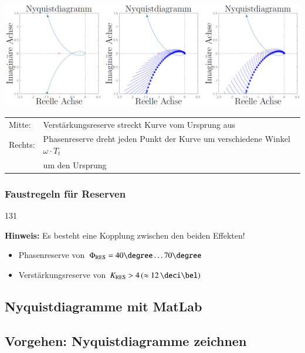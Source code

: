 
\includegraphics[width=\columnwidth]{images/nyquist_stabilitaetsreserven.png}

\begin{tabular}{ll}
    Mitte:  & Verstärkungsreserve streckt Kurve vom Ursprung aus \\
    Rechts: & Phasenreserve dreht jeden Punkt der Kurve um verschiedene Winkel $\omega \cdot T_t$ \\
            & um den Ursprung  
\end{tabular}


\subsubsection{Faustregeln für Reserven}{131}

\textbf{Hinweis:} Es besteht eine Kopplung zwischen den beiden Effekten!

\begin{itemize}
    \item Phasenreserve von $\Phi_{\rm RES} = 40 \degree \ldots 70 \degree$
    \item Verstärkungsreserve von $K_{\rm RES} > 4 \, (\approx 12 \, \deci \bel)$
\end{itemize}


\subsection{Nyquistdiagramme mit MatLab}




\subsection{Vorgehen: Nyquistdiagramme zeichnen}

